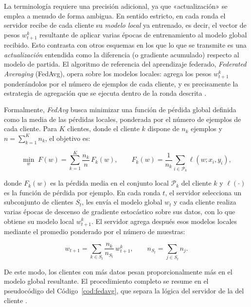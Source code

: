 La terminología requiere una precisión adicional, ya que «actualización» se emplea a menudo de forma
ambigua. En sentido estricto, en cada ronda el servidor recibe de cada cliente su
\textit{modelo local} ya entrenado, es decir, el vector de pesos $w_{t+1}^{k}$ resultante
de aplicar varias épocas de entrenamiento al modelo global recibido. Esto contrasta con
otros esquemas en los que lo que se transmite es una \textit{actualización} entendida
como la diferencia (o gradiente acumulado) respecto al modelo de partida. El algoritmo de
referencia del aprendizaje federado, \textit{Federated Averaging}
(FedAvg)\label{sec:fedavg}, opera sobre los modelos locales: agrega los pesos
$w_{t+1}^{k}$ ponderándolos por el número de ejemplos de cada cliente, y es precisamente
la estrategia de agregación que se ejecuta dentro de la ronda descrita
\parencite{mcmahan2017communication}.

Formalmente, \textit{FedAvg} busca minimizar una función de pérdida global definida como
la media de las pérdidas locales, ponderada por el número de ejemplos de cada cliente.
Para $K$ clientes, donde el cliente $k$ dispone de $n_k$ ejemplos y
$n = \sum_{k=1}^{K} n_k$, el objetivo es:

\begin{equation}
  \min_{w} \; F(w) = \sum_{k=1}^{K} \frac{n_k}{n}\, F_k(w),
  \qquad
  F_k(w) = \frac{1}{n_k} \sum_{i \in \mathcal{P}_k} \ell\!\left(w; x_i, y_i\right),
  \label{eq:fedavg-objetivo}
\end{equation}

\noindent donde $F_k(w)$ es la pérdida media en el conjunto local $\mathcal{P}_k$ del
cliente $k$ y $\ell(\cdot)$ es la función de pérdida por ejemplo. En cada ronda $t$, el
servidor selecciona un subconjunto de clientes $S_t$, les envía el modelo global $w_t$ y
cada cliente realiza varias épocas de descenso de gradiente estocástico sobre sus datos,
con lo que obtiene su modelo local $w_{t+1}^{k}$. El servidor agrega después esos modelos
locales mediante el promedio ponderado por el número de muestras:

\begin{equation}
  w_{t+1} = \sum_{k \in S_t} \frac{n_k}{n_{S_t}}\, w_{t+1}^{k},
  \qquad
  n_{S_t} = \sum_{j \in S_t} n_j .
  \label{eq:fedavg-agg}
\end{equation}

De este modo, los clientes con más datos pesan proporcionalmente más en el modelo global
resultante. El procedimiento completo se resume en el pseudocódigo del
Código~\ref{cod:fedavg}, que separa la lógica del servidor de la del cliente
\parencite{mcmahan2017communication}.

